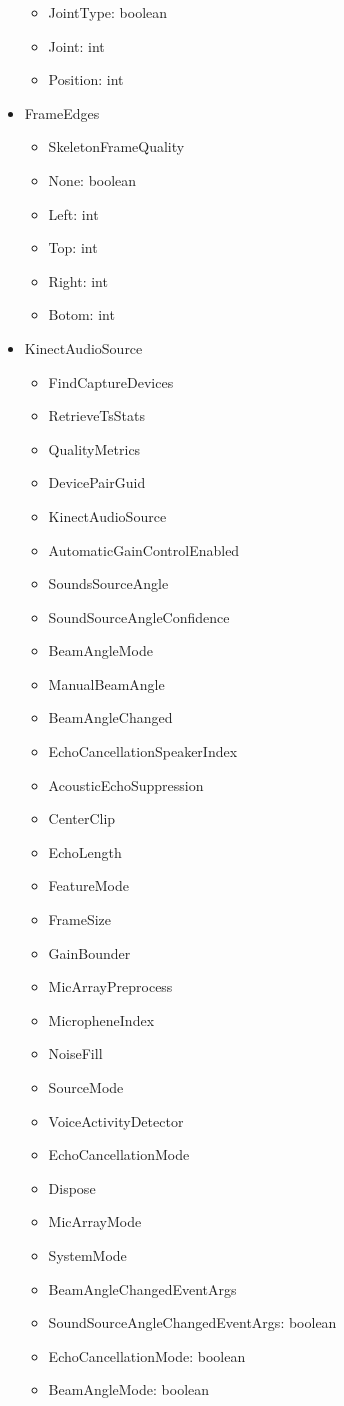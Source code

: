\documentclass[11pt,a4paper]{article}
\begin{document}
\begin{itemize}
\begin{itemize}
	\item JointType: boolean
	\item Joint: int
	\item Position: int
	\end{itemize}	
\item FrameEdges
	\begin{itemize}
	 \item SkeletonFrameQuality
	\item None: boolean
	\item Left: int
	\item Top: int
	\item Right: int
	\item Botom: int
	\end{itemize}
\item KinectAudioSource
	\begin{itemize}
	\item FindCaptureDevices
	\item RetrieveTsStats
	\item QualityMetrics
	\item DevicePairGuid
	\item KinectAudioSource
	\item AutomaticGainControlEnabled
	\item SoundsSourceAngle
	\item SoundSourceAngleConfidence
	\item BeamAngleMode
	\item ManualBeamAngle
	\item BeamAngleChanged
	\item EchoCancellationSpeakerIndex
	\item AcousticEchoSuppression
	\item CenterClip
	\item EchoLength
	\item FeatureMode
	\item FrameSize
	\item GainBounder
	\item MicArrayPreprocess
	\item MicropheneIndex
	\item NoiseFill
	\item SourceMode
	\item VoiceActivityDetector
	\item EchoCancellationMode
	\item Dispose
	\item MicArrayMode
	\item SystemMode
	\item BeamAngleChangedEventArgs
	\item SoundSourceAngleChangedEventArgs: boolean
	\item EchoCancellationMode: boolean
	\item BeamAngleMode: boolean
	\end{itemize}
\end{itemize}
\end{document}
